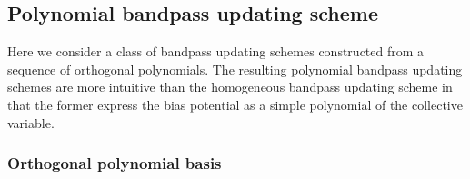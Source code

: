 \documentclass[preprint, superscriptaddress, floatfix]{revtex4-1}
\begin{document}
\subsection{\label{sec:bandpass_poly}
Polynomial bandpass updating scheme}


Here we consider a class of bandpass updating schemes
constructed from a sequence of orthogonal polynomials.
%
The resulting polynomial bandpass updating schemes are more intuitive
than the homogeneous bandpass updating scheme
in that the former express the bias potential as
a simple polynomial of the collective variable.

\subsubsection{Orthogonal polynomial basis}
\end{document}
